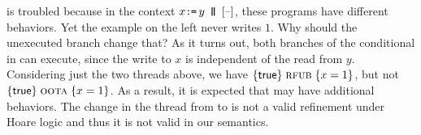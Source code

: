 \citeauthor{BoehmOOTA} is troubled because in the context
$x\GETS y \PAR \hole{}$, these programs have different behaviors.  Yet the
\oota{} example on the left never writes $1$.  Why should the unexecuted
branch change that?  As it turns out, both branches of the conditional in
\rfub{} can execute, since the write to $x$ is independent of the read from
$y$.  Considering just the two threads above, we have
$\{\mathsf{true}\}\allowbreak\;\text{{\sc rfub}}\;\allowbreak\{x=1\}$, but not
$\{\mathsf{true}\}\allowbreak\;\text{{\sc oota}}\;\allowbreak\{x=1\}$.  As a result, it is expected that \rfub{}
may have additional behaviors.  The change in the thread from \oota{} to
\rfub{} is not a valid refinement under Hoare logic and thus it is not valid
in our semantics.



